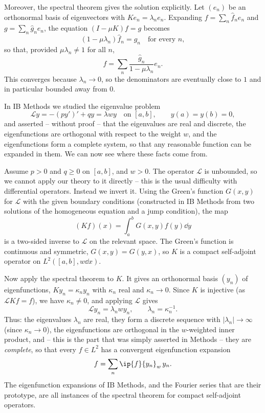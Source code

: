 Moreover, the spectral theorem gives the solution explicitly. Let $(e_n)$ be an orthonormal basis of eigenvectors with $Ke_n = \lambda_ne_n$. Expanding $f = \sum_n \hat f_ne_n$ and $g = \sum_n\hat g_ne_n$, the equation $(I-\mu K)f = g$ becomes
$$(1-\mu\lambda_n)\hat f_n = \hat g_n \quad \text{for every } n,$$
so that, provided $\mu\lambda_n\neq1$ for all $n$,
$$f = \sum_n \frac{\hat g_n}{1 - \mu\lambda_n}e_n.$$
This converges because $\lambda_n\to0$, so the denominators are eventually close to $1$ and in particular bounded away from $0$.

\begin{example}
	In IB Methods we studied the eigenvalue problem
	$$\mathcal{L}y = -(py')' + qy = \lambda w y \quad \text{on } [a,b], \qquad y(a)=y(b)=0,$$
	and asserted -- without proof -- that the eigenvalues are real and discrete, the eigenfunctions are orthogonal with respect to the weight $w$, and the eigenfunctions form a complete system, so that any reasonable function can be expanded in them. We can now see where these facts come from.

	Assume $p > 0$ and $q \geq 0$ on $[a,b]$, and $w>0$. The operator $\mathcal{L}$ is unbounded, so we cannot apply our theory to it directly -- this is the usual difficulty with differential operators. Instead we invert it. Using the Green's function $G(x,y)$ for $\mathcal{L}$ with the given boundary conditions (constructed in IB Methods from two solutions of the homogeneous equation and a jump condition), the map
	$$(Kf)(x) = \int_a^b G(x,y)f(y)\dd y$$
	is a two-sided inverse to $\mathcal{L}$ on the relevant space. The Green's function is continuous and symmetric, $G(x,y)=G(y,x)$, so $K$ is a compact self-adjoint operator on $L^2([a,b], w\dd x)$.

	Now apply the spectral theorem to $K$. It gives an orthonormal basis $(y_n)$ of eigenfunctions, $Ky_n = \kappa_ny_n$ with $\kappa_n$ real and $\kappa_n \to 0$. Since $K$ is injective (as $\mathcal{L}Kf = f$), we have $\kappa_n \neq 0$, and applying $\mathcal{L}$ gives
	$$\mathcal{L}y_n = \lambda_n w y_n, \qquad \lambda_n = \kappa_n^{-1}.$$
	Thus: the eigenvalues $\lambda_n$ are real, they form a discrete sequence with $|\lambda_n| \to \infty$ (since $\kappa_n\to0$), the eigenfunctions are orthogonal in the $w$-weighted inner product, and -- this is the part that was simply asserted in Methods -- they are \emph{complete}, so that every $f\in L^2$ has a convergent eigenfunction expansion
	$$f = \sum_n \ip{f}{y_n}_w\, y_n.$$
	The eigenfunction expansions of IB Methods, and the Fourier series that are their prototype, are all instances of the spectral theorem for compact self-adjoint operators.
\end{example}

